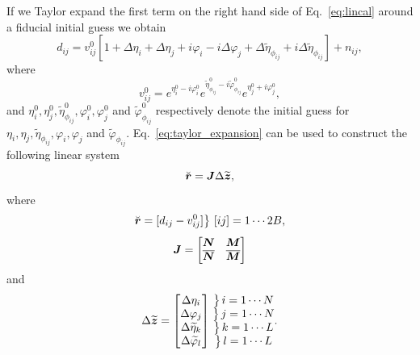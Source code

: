 \documentclass[useAMS,usenatbib]{mn2e}
\newcommand{\bz}{\bmath{z}}
\newcommand{\br}{\bmath{r}}
\newcommand{\bJ}{\bmath{J}}
\newcommand{\bN}{\bmath{N}}
\newcommand{\bM}{\bmath{M}}
\newcommand{\conj}[1]{\overline{#1}}
\newcommand\coolrightbrace[2]{%
\left.\vphantom{\begin{matrix} #1 \end{matrix}}\right\}#2}
\begin{document}
If we Taylor expand the first term on the right hand side of Eq.~\eqref{eq:lincal} around a fiducial initial guess we obtain
\begin{equation}
\label{eq:taylor_expansion}
d_{ij} = v_{ij}^0[1+\Delta \eta_i + \Delta \eta_j + i \varphi_i - i \Delta \varphi_j + \Delta \widetilde{\eta}_{\phi_{ij}} + i\Delta \widetilde{\eta}_{\phi_{ij}}] + n_{ij}, 
\end{equation}
where
\begin{equation}
v_{ij}^0 = e^{\eta_i^0 - i \varphi_i^0} e^{\widetilde{\eta}_{\phi_{ij}}^0 - i \widetilde{\varphi}_{\phi_{ij}}^0} e^{\eta_j^0 + i \varphi_j^0}, 
\end{equation}
and $\eta_i^0,\eta_j^0,\widetilde{\eta}_{\phi_{ij}}^0,\varphi_i^0,\varphi_j^0$ and $\widetilde{\varphi}_{\phi_{ij}}^0$ respectively denote the initial guess for $\eta_i,\eta_j,\widetilde{\eta}_{\phi_{ij}},\varphi_i,\varphi_j$ and $\widetilde{\varphi}_{\phi_{ij}}$.
Eq.~\eqref{eq:taylor_expansion} can be used to construct the following linear system
\begin{equation}
\breve{\br} = \bJ\Delta\widetilde{\bz}, 
\end{equation}
where 
\begin{equation}
\breve{\br} = [d_{ij}-v_{ij}^0] \big \} ~ [ij] = 1\cdots 2B, 
\end{equation}
\begin{equation}
\label{eq:jac_lincal}
\bJ = \begin{bmatrix}
      \bN & \bM\\
      \conj{\bN} & \conj{\bM}
      \end{bmatrix}
\end{equation}
and
\begin{equation}
\Delta\widetilde{\bz} = 
\begin{bmatrix}
\Delta \eta_i \\
\Delta \varphi_j \\
\Delta \widetilde{\eta}_k \\
\Delta \widetilde{\varphi}_l \\
\end{bmatrix}
\begin{matrix}%
\coolrightbrace{\eta_i}{i = 1\cdots N}\\
\coolrightbrace{\eta_i}{j = 1\cdots N}\\
\coolrightbrace{\eta_i}{k = 1\cdots L}\\
\coolrightbrace{\eta_i}{l = 1 \cdots L}
\end{matrix}.
\end{equation}
\end{document}
